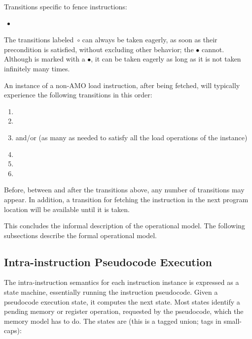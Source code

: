 \noindent Transitions specific to fence instructions:
\begin{itemize}
\item[$\circ$] 
\end{itemize}

The transitions labeled~$\circ$ can always be taken eagerly, as soon as their precondition is satisfied, without excluding other behavior; the $\bullet$ cannot.
Although  is marked with a $\bullet$, it can be taken eagerly as long as it is not taken infinitely many times.

An instance of a non-AMO load instruction, after being fetched, will typically experience the following transitions in this order:
\begin{enumerate}
\item {}
\item {}
\item {} and/or  (as many as needed to satisfy all the load operations of the instance)
\item {}
\item {}
\item {}
\end{enumerate}
Before, between and after the transitions above, any number of  transitions may appear.
In addition, a  transition for fetching the instruction in the next program location will be available until it is taken.

This concludes the informal description of the operational model.
The following subsections describe the formal operational model.

\subsection{Intra-instruction Pseudocode Execution}\label{sec:omm:pseudocode_exec}
The intra-instruction semantics for each instruction instance is expressed as a state machine, essentially running the instruction pseudocode.
Given a pseudocode execution state, it computes the next state.  Most
states identify a pending memory or register operation, requested by
the pseudocode, which the memory model has to do.  The
states are (this is a tagged union; tags in small-caps):

